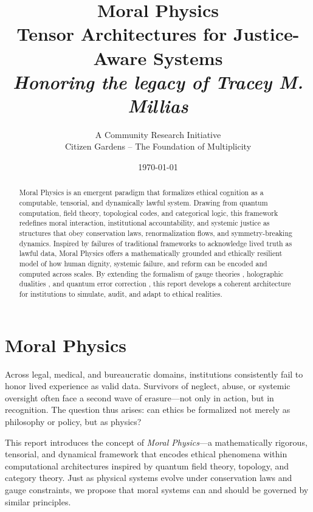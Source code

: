 \documentclass{article}
\theoremstyle{plain}
\theoremstyle{claimstyle}
\begin{document}
\title{\textbf{Moral Physics\\ \large Tensor Architectures for Justice-Aware Systems \\ \large \textit{Honoring the legacy of Tracey M. Millias}}}
\author{A Community Research Initiative \\ Citizen Gardens – The Foundation of Multiplicity}
\date{\today}


\maketitle

\begin{abstract}
Moral Physics is an emergent paradigm that formalizes ethical cognition as a computable, tensorial, and dynamically lawful system. Drawing from quantum computation, field theory, topological codes, and categorical logic, this framework redefines moral interaction, institutional accountability, and systemic justice as structures that obey conservation laws, renormalization flows, and symmetry-breaking dynamics. Inspired by failures of traditional frameworks to acknowledge lived truth as lawful data, Moral Physics offers a mathematically grounded and ethically resilient model of how human dignity, systemic failure, and reform can be encoded and computed across scales. By extending the formalism of gauge theories \citep{Noether1918}, holographic dualities \citep{Maldacena1998}, and quantum error correction \citep{Kitaev2003}, this report develops a coherent architecture for institutions to simulate, audit, and adapt to ethical realities.
\end{abstract}

\section{Moral Physics}

Across legal, medical, and bureaucratic domains, institutions consistently fail to honor lived experience as valid data. Survivors of neglect, abuse, or systemic oversight often face a second wave of erasure—not only in action, but in recognition. The question thus arises: can ethics be formalized not merely as philosophy or policy, but as physics?

This report introduces the concept of \textit{Moral Physics}—a mathematically rigorous, tensorial, and dynamical framework that encodes ethical phenomena within computational architectures inspired by quantum field theory, topology, and category theory. Just as physical systems evolve under conservation laws and gauge constraints, we propose that moral systems can and should be governed by similar principles.
\end{document}
